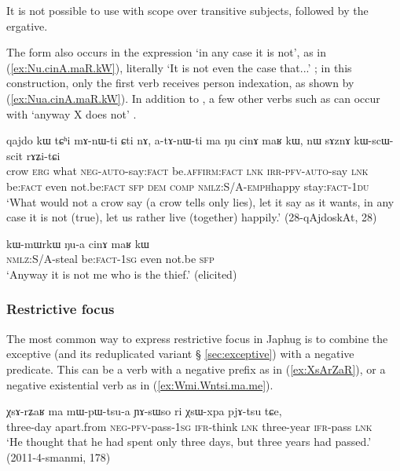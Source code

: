 It is not possible to use  with scope over transitive subjects, followed by the ergative.

The form  also occurs in the expression  `in any case it is not', as in (\ref{ex:Nu.cinA.maR.kW}), literally `It is not even the case that...' ; in this construction, only the first verb  receives person indexation, as shown by (\ref{ex:Nua.cinA.maR.kW}). In addition to , a few other verbs such as  can occur with  `anyway X does not' .

 \begin{exe}
\ex \label{ex:Nu.cinA.maR.kW}
\gll qajdo kɯ tɕʰi mɤ-nɯ-ti ɕti nɤ, a-tɤ-nɯ-ti ma ŋu cinɤ maʁ kɯ, nɯ sɤznɤ kɯ-scɯ-scit rɤʑi-tɕi \\
crow \textsc{erg} what \textsc{neg}-\textsc{auto}-say:\textsc{fact} be.\textsc{affirm}:\textsc{fact} \textsc{lnk} \textsc{irr}-\textsc{pfv}-\textsc{auto}-say \textsc{lnk} be:\textsc{fact} even not.be:\textsc{fact} \textsc{sfp} \textsc{dem} \textsc{comp} \textsc{nmlz}:S/A-\textsc{emph}\redp{}happy stay:\textsc{fact}-\textsc{1du} \\
\glt `What would not a crow say (a crow tells only lies), let it say as it wants, in any case it is not (true), let us rather live (together) happily.' (28-qAjdoskAt, 28)
\end{exe} 

 \begin{exe}
\ex \label{ex:Nua.cinA.maR.kW}
\gll  kɯ-mɯrkɯ ŋu-a cinɤ maʁ kɯ  \\
\textsc{nmlz}:S/A-steal be:\textsc{fact}-\textsc{1sg} even not.be \textsc{sfp} \\
\glt `Anyway it is not me who is the thief.' (elicited)
\end{exe}

\subsubsection{Restrictive focus} \label{sec:restrictive.focus} 
 The most common way to express restrictive focus in Japhug is to combine the exceptive  (and its reduplicated variant  § \ref{sec:exceptive}) with a negative predicate. This can be a verb with a negative prefix as in (\ref{ex:XsArZaR}), or a negative existential verb as in (\ref{ex:Wmi.Wntsi.ma.me}).
 
 \begin{exe}
\ex  \label{ex:XsArZaR}
\gll   χsɤ-rʑaʁ ma mɯ-pɯ-tsu-a ɲɤ-sɯso ri χsɯ-xpa pjɤ-tsu tɕe,  \\
three-day apart.from \textsc{neg}-\textsc{pfv}-pass-\textsc{1sg} \textsc{ifr}-think \textsc{lnk} three-year \textsc{ifr}-pass \textsc{lnk} \\
\glt `He thought that he had spent only three days, but three years had passed.' (2011-4-smanmi, 178)
  \end{exe}
  
